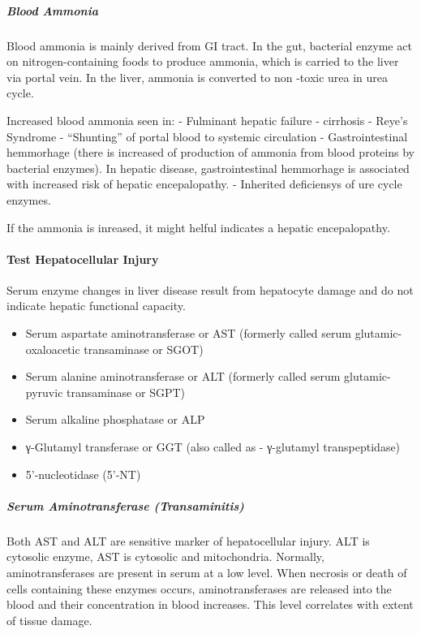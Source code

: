\documentclass[
  letterpaper,
  DIV=11,
  numbers=noendperiod]{scrreprt}
\let\oldparagraph\paragraph
\renewcommand{\paragraph}[1]{\oldparagraph{#1}\mbox{}}
\let\oldsubparagraph\subparagraph
\renewcommand{\subparagraph}[1]{\oldsubparagraph{#1}\mbox{}}
\providecommand{\tightlist}{%
  \setlength{\itemsep}{0pt}\setlength{\parskip}{0pt}}\usepackage{longtable,booktabs,array}
\begin{document}
\subparagraph{Blood Ammonia}\label{blood-ammonia}

Blood ammonia is mainly derived from GI tract. In the gut, bacterial
enzyme act on nitrogen-containing foods to produce ammonia, which is
carried to the liver via portal vein. In the liver, ammonia is converted
to non -toxic urea in urea cycle.

Increased blood ammonia seen in: - Fulminant hepatic failure - cirrhosis
- Reye's Syndrome - ``Shunting'' of portal blood to systemic circulation
- Gastrointestinal hemmorhage (there is increased of production of
ammonia from blood proteins by bacterial enzymes). In hepatic disease,
gastrointestinal hemmorhage is associated with increased risk of hepatic
encepalopathy. - Inherited deficiensys of ure cycle enzymes.

If the ammonia is inreased, it might helful indicates a hepatic
encepalopathy.

\paragraph{Test Hepatocellular Injury}\label{test-hepatocellular-injury}

Serum enzyme changes in liver disease result from hepatocyte damage and
do not indicate hepatic functional capacity.

\begin{itemize}
\tightlist
\item
  Serum aspartate aminotransferase or AST (formerly called serum
  glutamic-oxaloacetic transaminase or SGOT)
\item
  Serum alanine aminotransferase or ALT (formerly called serum
  glutamic-pyruvic transaminase or SGPT)
\item
  Serum alkaline phosphatase or ALP
\item
  γ-Glutamyl transferase or GGT (also called as - γ-glutamyl
  transpeptidase)
\item
  5'-nucleotidase (5'-NT)
\end{itemize}

\subparagraph{Serum Aminotransferase
(Transaminitis)}\label{serum-aminotransferase-transaminitis}

Both AST and ALT are sensitive marker of hepatocellular injury. ALT is
cytosolic enzyme, AST is cytosolic and mitochondria. Normally,
aminotransferases are present in serum at a low level. When necrosis or
death of cells containing these enzymes occurs, aminotransferases are
released into the blood and their concentration in blood increases. This
level correlates with extent of tissue damage.
\end{document}
